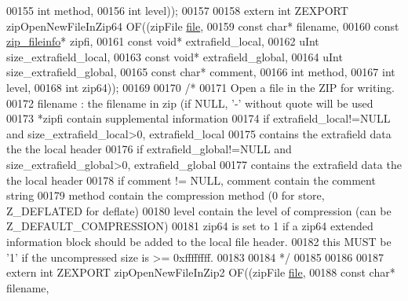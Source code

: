 \begin{DoxyCode}
00155                        \textcolor{keywordtype}{int} method,
00156                        \textcolor{keywordtype}{int} level));
00157 
00158 \textcolor{keyword}{extern} \textcolor{keywordtype}{int} ZEXPORT zipOpenNewFileInZip64 OF((zipFile \hyperlink{structfile}{file},
00159                        \textcolor{keyword}{const} \textcolor{keywordtype}{char}* filename,
00160                        \textcolor{keyword}{const} \hyperlink{structzip__fileinfo}{zip\_fileinfo}* zipfi,
00161                        \textcolor{keyword}{const} \textcolor{keywordtype}{void}* extrafield\_local,
00162                        uInt size\_extrafield\_local,
00163                        \textcolor{keyword}{const} \textcolor{keywordtype}{void}* extrafield\_global,
00164                        uInt size\_extrafield\_global,
00165                        \textcolor{keyword}{const} \textcolor{keywordtype}{char}* comment,
00166                        \textcolor{keywordtype}{int} method,
00167                        \textcolor{keywordtype}{int} level,
00168                        \textcolor{keywordtype}{int} zip64));
00169 
00170 \textcolor{comment}{/*}
00171 \textcolor{comment}{  Open a file in the ZIP for writing.}
00172 \textcolor{comment}{  filename : the filename in zip (if NULL, '-' without quote will be used}
00173 \textcolor{comment}{  *zipfi contain supplemental information}
00174 \textcolor{comment}{  if extrafield\_local!=NULL and size\_extrafield\_local>0, extrafield\_local}
00175 \textcolor{comment}{    contains the extrafield data the the local header}
00176 \textcolor{comment}{  if extrafield\_global!=NULL and size\_extrafield\_global>0, extrafield\_global}
00177 \textcolor{comment}{    contains the extrafield data the the local header}
00178 \textcolor{comment}{  if comment != NULL, comment contain the comment string}
00179 \textcolor{comment}{  method contain the compression method (0 for store, Z\_DEFLATED for deflate)}
00180 \textcolor{comment}{  level contain the level of compression (can be Z\_DEFAULT\_COMPRESSION)}
00181 \textcolor{comment}{  zip64 is set to 1 if a zip64 extended information block should be added to the local file header.}
00182 \textcolor{comment}{                    this MUST be '1' if the uncompressed size is >= 0xffffffff.}
00183 \textcolor{comment}{}
00184 \textcolor{comment}{*/}
00185 
00186 
00187 \textcolor{keyword}{extern} \textcolor{keywordtype}{int} ZEXPORT zipOpenNewFileInZip2 OF((zipFile \hyperlink{structfile}{file},
00188                                             \textcolor{keyword}{const} \textcolor{keywordtype}{char}* filename,

\end{DoxyCode}
